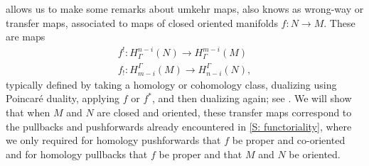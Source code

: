  allows us to make some remarks about umkehr maps, also knows as wrong-way or transfer maps, associated to maps of closed oriented manifolds $f:N\to M$. These are maps 
\begin{align*}
f^!:H^{n-i}_\Gamma(N)\to H^{m-i}_\Gamma(M)\\
f_!:H_{m-i}^\Gamma(M)\to H_{n-i}^\Gamma(N),
\end{align*}
typically defined by taking a homology or cohomology class, dualizing using Poincar\'e duality, applying $f$ or $f^*$, and then dualizing again; see \cite[Definition VI.11.2]{Bred97}. We will show that when $M$ and $N$ are closed and oriented, these transfer maps correspond to the pullbacks and pushforwards already encountered in \cref{S: functoriality}, where we only required for homology pushforwards that $f$ be proper and co-oriented and for homology pullbacks that $f$ be proper and  that $M$ and $N$ be oriented.


